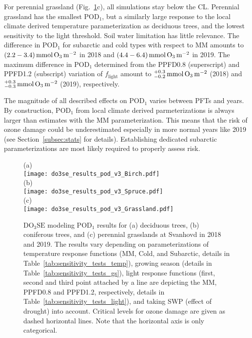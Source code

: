 \documentclass[bg, manuscript]{copernicus}
\begin{document}
For perennial grassland (Fig.~\ref{fig:pody_rel}c), all simulations stay below the CL. Perennial grassland has the smallest $\mathrm{POD_1}$, but a similarly large response to the local climate derived temperature parameterization as deciduous trees, and the lowest sensitivity to the light threshold. Soil water limitation has little relevance. The difference in $\mathrm{POD_1}$ for subarctic and cold types with respect to MM amounts to $(2.2-3.4)\,\unit{mmol\,\chem{O_3}\,m^{-2}}$ in 2018 and $(4.4-6.4)\,\unit{mmol\,\chem{O_3}\,m^{-2}}$ in 2019. The maximum difference in $\mathrm{POD_1}$ determined from the PPFD0.8 (superscript) and PPFD1.2 (subscript) variation of $f_\mathrm{light}$ amount to $^{+0.3}_{-0.2}\,\unit{mmol\,\chem{O_3}\,m^{-2}}$ (2018) and $^{+0.3}_{-0.3}\,\unit{mmol\,\chem{O_3}\,m^{-2}}$ (2019), respectively.

The magnitude of all described effects on $\mathrm{POD_1}$ varies between PFTs and years. By construction, $\mathrm{POD_1}$ from local climate derived parmeterizations is always larger than estimates with the MM parameterization. This means that the risk of ozone damage could be underestimated especially in more normal years like 2019 (see Section~\ref{subsec:stats} for details). Establishing dedicated subarctic parameterizations are most likely required to properly assess risk.

\begin{figure}[t]
  \centering
  (a)\\
  \texttt{[image: do3se\_results\_pod\_v3\_Birch.pdf]}\\
  (b)\\
  \texttt{[image: do3se\_results\_pod\_v3\_Spruce.pdf]}\\
  (c)\\
  \texttt{[image: do3se\_results\_pod\_v3\_Grassland.pdf]}
  \caption{$\mathrm{DO_3SE}$ modeling $\mathrm{POD_1}$ results for (a) deciduous trees, (b) coniferous trees, and (c) perennial grasslands at Svanhovd in 2018 and 2019. The results vary depending on parameterizations of temperature response functions (MM, Cold, and Subarctic, details in Table~\ref{tab:sensitivity_tests_temp}), growing season (details in Table~\ref{tab:sensitivity_tests_gs}), light response functions (first, second and third point attached by a line are depicting the MM, PPFD0.8 and PPFD1.2, respectively, details in Table~\ref{tab:sensitivity_tests_light}), and taking SWP (effect of drought) into account. Critical levels for ozone damage \citep{ICP:MappingManual2017,ESPR:Hayes2021} are given as dashed horizontal lines. Note that the horizontal axis is only categorical.}
  \label{fig:pody_rel}
\end{figure}
\end{document}
